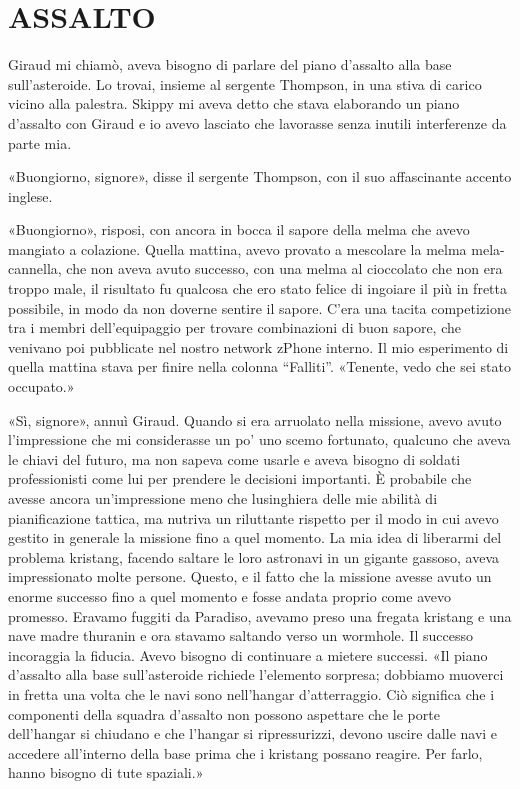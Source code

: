 \chapter{ASSALTO}\label{assalto}

\hfill\break

Giraud mi chiamò, aveva bisogno di parlare del piano d'assalto alla base
sull'asteroide. Lo trovai, insieme al sergente Thompson, in una stiva di
carico vicino alla palestra. Skippy mi aveva detto che stava elaborando
un piano d'assalto con Giraud e io avevo lasciato che lavorasse senza
inutili interferenze da parte mia.

«Buongiorno, signore», disse il sergente Thompson, con il suo
affascinante accento inglese.

«Buongiorno», risposi, con ancora in bocca il sapore della melma che
avevo mangiato a colazione. Quella mattina, avevo provato a mescolare la
melma mela-cannella, che non aveva avuto successo, con una melma al
cioccolato che non era troppo male, il risultato fu qualcosa che ero
stato felice di ingoiare il più in fretta possibile, in modo da non
doverne sentire il sapore. C'era una tacita competizione tra i membri
dell'equipaggio per trovare combinazioni di buon sapore, che venivano
poi pubblicate nel nostro network zPhone interno. Il mio esperimento di
quella mattina stava per finire nella colonna ``Falliti''. «Tenente,
vedo che sei stato occupato.»

«Sì, signore», annuì Giraud. Quando si era arruolato nella missione,
avevo avuto l'impressione che mi considerasse un po' uno scemo
fortunato, qualcuno che aveva le chiavi del futuro, ma non sapeva come
usarle e aveva bisogno di soldati professionisti come lui per prendere
le decisioni importanti. È probabile che avesse ancora un'impressione
meno che lusinghiera delle mie abilità di pianificazione tattica, ma
nutriva un riluttante rispetto per il modo in cui avevo gestito in
generale la missione fino a quel momento. La mia idea di liberarmi del
problema kristang, facendo saltare le loro astronavi in un gigante
gassoso, aveva impressionato molte persone. Questo, e il fatto che la
missione avesse avuto un enorme successo fino a quel momento e fosse
andata proprio come avevo promesso. Eravamo fuggiti da Paradiso, avevamo
preso una fregata kristang e una nave madre thuranin e ora stavamo
saltando verso un wormhole. Il successo incoraggia la fiducia. Avevo
bisogno di continuare a mietere successi. «Il piano d'assalto alla base
sull'asteroide richiede l'elemento sorpresa; dobbiamo muoverci in fretta
una volta che le navi sono nell'hangar d'atterraggio. Ciò significa che
i componenti della squadra d'assalto non possono aspettare che le porte
dell'hangar si chiudano e che l'hangar si ripressurizzi, devono uscire
dalle navi e accedere all'interno della base prima che i kristang
possano reagire. Per farlo, hanno bisogno di tute spaziali.»

